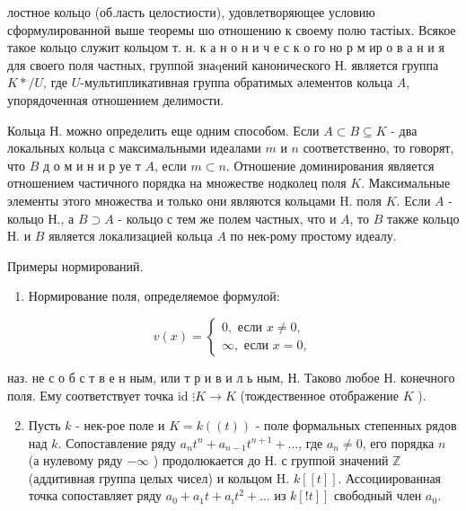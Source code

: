 \documentclass[10pt]{article}
\begin{document}
лостное кольцо (об.ласть целостиости), удовлетворяющее условию сформулированной выше теоремы шо отношению к своему полю тастіых. Всякое такое кольцо служит кольцом т. н. к а н о н и ч е с к о го но р м ир о в а н и я для своего поля частных, группой знаqений канонического Н. является группа $K * / U$, где $U$-мультипликативная группа обратимых әлементов кольца $A$, упорядоченная отношением делимости.



Кольца Н. можно определить еще одним способом. Если $A \subset B \subseteq K$ - два локальных кольца с максимальными идеалами $m$ и $n$ соответственно, то говорят, что $B$ д о м и н и р уе т $A$, если $m \subset n$. Отношение доминирования является отношением частичного порядка на множестве нодколец поля $K$. Максимальные элементы этого множества и только они являются кольцами $\mathrm{H}$. поля $K$. Если $A$ - кольцо Н., а $B \supset A$ - кольцо с тем же полем частных, что и $A$, то $B$ также кольцо Н. и $B$ является локализацией кольца $A$ по нек-рому простому идеалу.



Примеры нормирований.



\begin{enumerate}

  \item Нормирование поля, определяемое формулой:

\end{enumerate}



\[

v(x)=\left\{\begin{array}{l}

0, \text { если } x \neq 0, \\

\infty, \text { если } x=0,

\end{array}\right.

\]



наз. не с о б с т в е н ным, или т р и в и л ь ным, Н. Таково любое Н. конечного поля. Ему соответствует точка id $\vdots K \rightarrow K$ (тождественное отображение $K$ ).



\begin{enumerate}

  \setcounter{enumi}{1}

  \item Пусть $k$ - нек-рое поле и $K=k((t))$ - поле формальных степенных рядов над $k$. Сопоставление ряду $a_{n} t^{n}+a_{n-1} t^{n+1}+\ldots$, где $a_{n} \neq 0$, его порядка $n$ (а нулевому ряду $-\infty$ ) продолюкается до Н. с группой значений $\mathbb{Z}$ (аддитивная группа целых чисел) и кольцом H. $k[[t]]$. Ассоциированная точка сопоставляет ряду $a_{0}+a_{1} t+a_{\imath} t^{2}+\ldots$ из $\left.k[! t]\right]$ свободный член $a_{0}$.

\end{enumerate}
\end{document}
